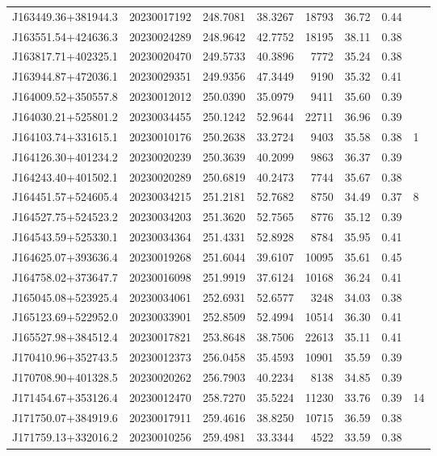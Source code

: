 \documentclass{article}
\begin{document}
\begin {longtable}{|l|l|r|r|r|r|r|l|}
 J163449.36+381944.3&  20230017192&  248.7081&   38.3267& 18793& 36.72& 0.44&\\
 J163551.54+424636.3&  20230024289&  248.9642&   42.7752& 18195& 38.11& 0.38&\\
 J163817.71+402325.1&  20230020470&  249.5733&   40.3896&  7772& 35.24& 0.38&\\
 J163944.87+472036.1&  20230029351&  249.9356&   47.3449&  9190& 35.32& 0.41&\\
 J164009.52+350557.8&  20230012012&  250.0390&   35.0979&  9411& 35.60& 0.39&\\
 J164030.21+525801.2&  20230034455&  250.1242&   52.9644& 22711& 36.96& 0.39&\\
 J164103.74+331615.1&  20230010176&  250.2638&   33.2724&  9403& 35.58& 0.38&1\\
 J164126.30+401234.2&  20230020239&  250.3639&   40.2099&  9863& 36.37& 0.39&\\
 J164243.40+401502.1&  20230020289&  250.6819&   40.2473&  7744& 35.67& 0.38&\\
 J164451.57+524605.4&  20230034215&  251.2181&   52.7682&  8750& 34.49& 0.37&8\\
 J164527.75+524523.2&  20230034203&  251.3620&   52.7565&  8776& 35.12& 0.39&\\
 J164543.59+525330.1&  20230034364&  251.4331&   52.8928&  8784& 35.95& 0.41&\\
 J164625.07+393636.4&  20230019268&  251.6044&   39.6107& 10095& 35.61& 0.45&\\
 J164758.02+373647.7&  20230016098&  251.9919&   37.6124& 10168& 36.24& 0.41&\\
 J165045.08+523925.4&  20230034061&  252.6931&   52.6577&  3248& 34.03& 0.38&\\
 J165123.69+522952.0&  20230033901&  252.8509&   52.4994& 10514& 36.30& 0.41&\\
 J165527.98+384512.4&  20230017821&  253.8648&   38.7506& 22613& 35.11& 0.41&\\
 J170410.96+352743.5&  20230012373&  256.0458&   35.4593& 10901& 35.59& 0.39&\\
 J170708.90+401328.5&  20230020262&  256.7903&   40.2234&  8138& 34.85& 0.39&\\
 J171454.67+353126.4&  20230012470&  258.7270&   35.5224& 11230& 33.76& 0.39&14\\
 J171750.07+384919.6&  20230017911&  259.4616&   38.8250& 10715& 36.59& 0.38&\\
 J171759.13+332016.2&  20230010256&  259.4981&   33.3344&  4522& 33.59& 0.38&\\
 \end{longtable}
\end{document}

